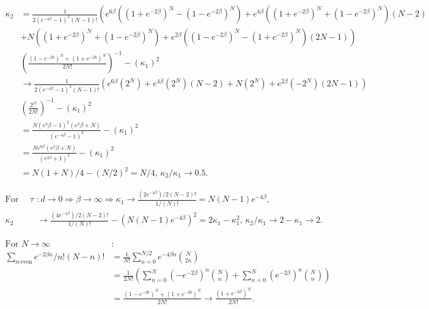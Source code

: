 \documentclass{article}
\begin{document}
\begin{align*}
    \kappa_2 & = \frac{1}{2(e^{-4\beta}-1)^2 (N-1)!} \left(e^{6\beta} ((1+e^{-2\beta} )^N-(1-e^{-2\beta} )^N ) + e^{4\beta} ((1+e^{-2\beta} )^N+(1-e^{-2\beta} )^N )(N-2) \right. \\
             & \left. + N((1+e^{-2\beta} )^N+(1-e^{-2\beta} )^N ) + e^{2\beta} ((1-e^{-2\beta} )^N-(1+e^{-2\beta} )^N )(2N-1) \right)                                             \\
             & \left(\frac{(1-e^{-2b})^N+(1+e^{-2b})^N}{2N!}\right)^{-1} - (\kappa_1 )^2                                                                                          \\
             & \rightarrow \frac{1}{2(e^{-4\beta}-1)^2 (N-1)!} \left(e^{6\beta} (2^N ) + e^{4\beta} (2^N )(N-2) + N(2^N ) + e^{2\beta} (-2^N )(2N-1) \right)                      \\
             & \left(\frac{2^N}{2N!}\right)^{-1} - (\kappa_1 )^2                                                                                                                  \\
             & = \frac{N(e^2\beta-1)^2 (e^2\beta+N)}{(e^{-4\beta}-1)^2} - (\kappa_1 )^2                                                                                           \\
             & = \frac{Ne^{8\beta} (e^2\beta+N)}{(e^{2\beta}+1)^2} - (\kappa_1 )^2                                                                                                \\
             & = N(1+N)/4-(N/2)^2=N/4, \, \kappa_2/\kappa_1 \rightarrow 0.5.
\end{align*}

\begin{align*}
    \text{For large } \tau & : d \rightarrow 0 \Rightarrow \beta \rightarrow \infty \Rightarrow \kappa_1 \rightarrow \frac{(2e^{-4\beta})/2(N-2)!}{1/(N)!} = N(N-1) e^{-4\beta},           \\
    \kappa_2               & \rightarrow \frac{(4e^{-4\beta})/2(N-2)!}{1/(N)!} - (N(N-1) e^{-4\beta})^2 = 2\kappa_1-\kappa_1^2, \, \kappa_2/\kappa_1 \rightarrow 2-\kappa_1 \rightarrow 2.
\end{align*}

\begin{align*}
    \text{For } N \rightarrow \infty               & :                                                                                                                   \\
    \sum_{n \, \text{even}} e^{-2\beta n}/n!(N-n)! & = \frac{1}{N!} \sum_{n=0}^{N/2} e^{-4\beta n} \binom{N}{2n}                                                         \\
                                                   & = \frac{1}{2N!} \left(\sum_{n=0}^N (-e^{-2\beta})^n \binom{N}{n} + \sum_{n=0}^N (e^{-2\beta})^n \binom{N}{n}\right) \\
                                                   & = \frac{(1-e^{-2b})^N+(1+e^{-2b})^N}{2N!} \rightarrow \frac{(1+e^{-2\beta})^N}{2N!}.
\end{align*}
\end{document}
